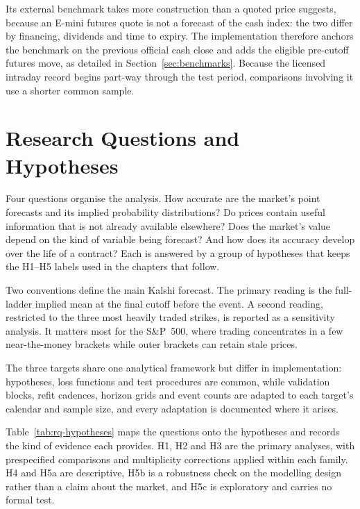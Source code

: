 \documentclass[12pt,a4paper]{report}
\begin{document}
Its external benchmark takes more construction than a quoted price
suggests, because an E-mini futures quote is not a forecast of the cash index:
the two differ by financing, dividends and time to expiry. The implementation
therefore anchors the benchmark on the previous official cash close and adds
the eligible pre-cutoff futures move, as detailed in
Section~\ref{sec:benchmarks}. Because the licensed intraday record begins
part-way through the test period, comparisons involving it use a shorter common
sample.

\section{Research Questions and Hypotheses}
\label{sec:hypotheses}

Four questions organise the analysis. How accurate are the market's point
forecasts and its implied probability distributions? Do prices contain useful information that is not already available elsewhere? Does the market's value depend on
the kind of variable being forecast? And how does its accuracy develop over
the life of a contract? Each is answered by a group of hypotheses that keeps
the H1--H5 labels used in the chapters that follow.

Two conventions define the main Kalshi forecast. The primary reading is the
full-ladder implied mean at the final cutoff before the event. A second reading,
restricted to the three most heavily traded strikes, is reported as a
sensitivity analysis. It matters most for the S\&P~500, where trading
concentrates in a few near-the-money brackets while outer brackets can retain
stale prices.

The three targets share one
analytical framework but differ in implementation: hypotheses, loss
functions and test procedures are common, while validation blocks, refit
cadences, horizon grids and event counts are adapted to each target's calendar
and sample size, and every adaptation is documented where it arises.

Table~\ref{tab:rq-hypotheses} maps the questions onto the hypotheses and
records the kind of evidence each provides. H1, H2 and H3 are the primary
analyses, with prespecified comparisons and multiplicity corrections applied
within each family. H4 and H5a are descriptive, H5b is a robustness check on
the modelling design rather than a claim about the market, and H5c is
exploratory and carries no formal test.
\end{document}

